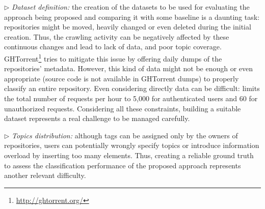 \vspace{.2cm}
\noindent
$\triangleright$ \emph{Dataset definition:} the creation of the datasets to be 
used for evaluating the approach being proposed and comparing it with some 
baseline is a daunting task: repositories might be moved, heavily changed or 
even deleted during the initial creation. Thus, the crawling activity can be 
negatively affected by these continuous changes and lead to lack of data, and 
poor topic coverage. GHTorrent\footnote{\url{http://ghtorrent.org/}} tries to 
mitigate this issue by offering daily dumps of the repositories' metadata. 
However, this kind of data might not be enough or even appropriate (\eg source 
code is not available in GHTorrent dumps) to properly classify  an entire 
repository.	Even considering directly \GH data can be difficult: \GH limits the 
total number of requests per hour to 5,000 for authenticated users and 60 for 
unauthorized requests. Considering all these constraints, building a suitable 
dataset represents a real challenge to be managed carefully.
	
\vspace{.2cm}
\noindent
$\triangleright$ \emph{Topics distribution:} although tags can be assigned only 
by the owners of \GH repositories, users can potentially wrongly specify topics 
or introduce information overload by inserting too many elements. Thus, 
creating a reliable ground truth to assess the classification performance of 
the proposed approach represents another relevant difficulty. 